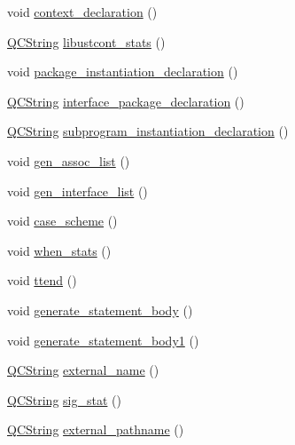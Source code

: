 \begin{DoxyCompactItemize}
void \hyperlink{classvhdl_1_1parser_1_1_vhdl_parser_a0963acfd4be88c9f9f32a809456b793b}{context\+\_\+declaration} ()
\item 
\hyperlink{class_q_c_string}{Q\+C\+String} \hyperlink{classvhdl_1_1parser_1_1_vhdl_parser_a58f4e8b71b115da7494c1a3b671fb63c}{libustcont\+\_\+stats} ()
\item 
void \hyperlink{classvhdl_1_1parser_1_1_vhdl_parser_a5e199823d9087693452bdbbe69ee38de}{package\+\_\+instantiation\+\_\+declaration} ()
\item 
\hyperlink{class_q_c_string}{Q\+C\+String} \hyperlink{classvhdl_1_1parser_1_1_vhdl_parser_a31654abb75d42dc803a7b28d6ac4e917}{interface\+\_\+package\+\_\+declaration} ()
\item 
\hyperlink{class_q_c_string}{Q\+C\+String} \hyperlink{classvhdl_1_1parser_1_1_vhdl_parser_abe429b509d12702d7f5d68f8a4e92301}{subprogram\+\_\+instantiation\+\_\+declaration} ()
\item 
void \hyperlink{classvhdl_1_1parser_1_1_vhdl_parser_aca8ccd23692c3580e46a829b89b56f77}{gen\+\_\+assoc\+\_\+list} ()
\item 
void \hyperlink{classvhdl_1_1parser_1_1_vhdl_parser_aa213e107a77c193f19a32f28c8fdb13f}{gen\+\_\+interface\+\_\+list} ()
\item 
void \hyperlink{classvhdl_1_1parser_1_1_vhdl_parser_a21f8f2f33f401a59deb8a0f5605528fb}{case\+\_\+scheme} ()
\item 
void \hyperlink{classvhdl_1_1parser_1_1_vhdl_parser_a5e4de822ed11e598491f487b9c98cc02}{when\+\_\+stats} ()
\item 
void \hyperlink{classvhdl_1_1parser_1_1_vhdl_parser_a4caa79ee37685aeb31331ae62b8c693e}{ttend} ()
\item 
void \hyperlink{classvhdl_1_1parser_1_1_vhdl_parser_a04ae5c0843de59e630e3913e5381f66e}{generate\+\_\+statement\+\_\+body} ()
\item 
void \hyperlink{classvhdl_1_1parser_1_1_vhdl_parser_a8cd3a28640792251d3d075bed6ca894d}{generate\+\_\+statement\+\_\+body1} ()
\item 
\hyperlink{class_q_c_string}{Q\+C\+String} \hyperlink{classvhdl_1_1parser_1_1_vhdl_parser_adc7c57d4be8e2c6009a08e3bfe2c0ca1}{external\+\_\+name} ()
\item 
\hyperlink{class_q_c_string}{Q\+C\+String} \hyperlink{classvhdl_1_1parser_1_1_vhdl_parser_a14b1657451f6dff99156a4c713d71efd}{sig\+\_\+stat} ()
\item 
\hyperlink{class_q_c_string}{Q\+C\+String} \hyperlink{classvhdl_1_1parser_1_1_vhdl_parser_afe587ddce2c5086cab3148372eddf08e}{external\+\_\+pathname} ()

\end{DoxyCompactItemize}
